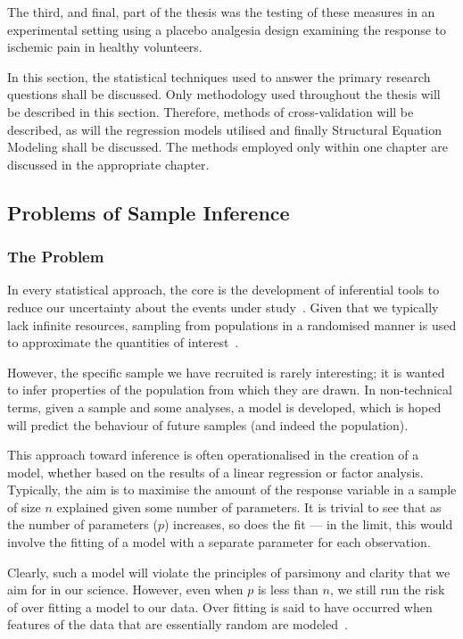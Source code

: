 The third, and final, part of the thesis was the testing of these measures in an experimental setting using a placebo analgesia design examining the response to ischemic pain in healthy volunteers. 


In this section, the statistical techniques used to answer the primary research questions shall be discussed. Only methodology used throughout the thesis will be described in this section. Therefore, methods of cross-validation will be described, as will the regression models utilised and finally Structural Equation Modeling shall be discussed. The methods employed only within one chapter are discussed in the appropriate chapter. 

\subsection{Problems of Sample Inference}
\label{sec:probl-sample-infer}
\subsubsection{The Problem}

In every statistical approach, the core is the development of inferential tools to reduce our uncertainty about the events under study~\cite{gelman2010philosophy}. Given that we typically lack infinite resources, sampling from populations in a randomised manner is used to approximate the quantities of interest~\cite{venables2002modern}.

However, the specific sample we have recruited is rarely interesting; it is wanted to infer properties of the population  from which they are drawn.  In non-technical terms, given a sample and some analyses, a model is developed,  which is hoped will predict the behaviour of future samples (and indeed the population).

This approach toward inference is often operationalised in the creation of a model, whether based on the results of a linear regression or factor analysis. Typically, the aim is to maximise the amount of the response variable  in a sample of size $n$ explained given some number of parameters. It is trivial to see that as the number of parameters ($p$) increases, so does the fit --- in the limit, this would involve the fitting of a model with a separate parameter for each observation. 

Clearly, such a model will violate the principles of parsimony and clarity that we aim for in our science. However, even when $p$ is less than $n$, we still run the risk of over fitting a model to our data. Over fitting is said to have occurred when  features of the data that are essentially random are modeled~\cite{friedman2009elements}. 


